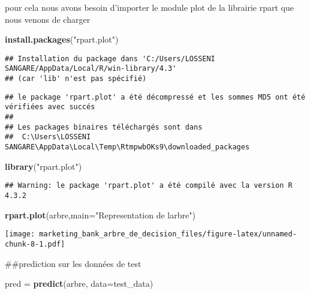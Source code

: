 \documentclass[
]{article}
\newenvironment{Shaded}{\begin{snugshade}}{\end{snugshade}}
\newcommand{\AttributeTok}[1]{\textcolor[rgb]{0.13,0.29,0.53}{#1}}
\newcommand{\FunctionTok}[1]{\textcolor[rgb]{0.13,0.29,0.53}{\textbf{#1}}}
\newcommand{\NormalTok}[1]{#1}
\newcommand{\OtherTok}[1]{\textcolor[rgb]{0.56,0.35,0.01}{#1}}
\newcommand{\StringTok}[1]{\textcolor[rgb]{0.31,0.60,0.02}{#1}}
\begin{document}
pour cela nous avons besoin d'importer le module plot de la librairie
rpart que nous venons de charger

\begin{Shaded}
\begin{Highlighting}[]
\FunctionTok{install.packages}\NormalTok{(}\StringTok{"rpart.plot"}\NormalTok{)}
\end{Highlighting}
\end{Shaded}

\begin{verbatim}
## Installation du package dans 'C:/Users/LOSSENI SANGARE/AppData/Local/R/win-library/4.3'
## (car 'lib' n'est pas spécifié)
\end{verbatim}

\begin{verbatim}
## le package 'rpart.plot' a été décompressé et les sommes MD5 ont été vérifiées avec succés
## 
## Les packages binaires téléchargés sont dans
##  C:\Users\LOSSENI SANGARE\AppData\Local\Temp\RtmpwbOKs9\downloaded_packages
\end{verbatim}

\begin{Shaded}
\begin{Highlighting}[]
\FunctionTok{library}\NormalTok{(}\StringTok{"rpart.plot"}\NormalTok{)}
\end{Highlighting}
\end{Shaded}

\begin{verbatim}
## Warning: le package 'rpart.plot' a été compilé avec la version R 4.3.2
\end{verbatim}

\begin{Shaded}
\begin{Highlighting}[]
\FunctionTok{rpart.plot}\NormalTok{(arbre,}\AttributeTok{main=}\StringTok{"Representation de l\textquotesingle{}arbre"}\NormalTok{)}
\end{Highlighting}
\end{Shaded}

\texttt{[image: marketing\_bank\_arbre\_de\_decision\_files/figure-latex/unnamed-chunk-8-1.pdf]}

\#\#prediction sur les données de test

\begin{Shaded}
\begin{Highlighting}[]
\NormalTok{pred }\OtherTok{=} \FunctionTok{predict}\NormalTok{(arbre, }\AttributeTok{data=}\NormalTok{test\_data)}
\end{Highlighting}
\end{Shaded}
\end{document}
